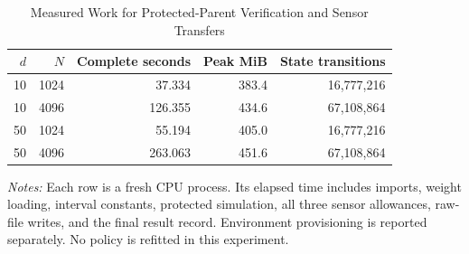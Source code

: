\begin{table}[!htbp]
\centering
\caption{Measured Work for Protected-Parent Verification and Sensor Transfers}
\label{tab:r15observationwork}
\footnotesize
\begin{tabular}{rrrrr}
\toprule
$d$ & $N$ & Complete seconds & Peak MiB & State transitions \\
\midrule
10 & 1024 & 37.334 & 383.4 & 16,777,216 \\
10 & 4096 & 126.355 & 434.6 & 67,108,864 \\
50 & 1024 & 55.194 & 405.0 & 16,777,216 \\
50 & 4096 & 263.063 & 451.6 & 67,108,864 \\
\bottomrule
\end{tabular}
\begin{minipage}{0.95\linewidth}\footnotesize
\emph{Notes:} Each row is a fresh CPU process. Its elapsed time includes imports,
weight loading, interval constants, protected simulation, all three sensor
allowances, raw-file writes, and the final result record. Environment provisioning
is reported separately. No policy is refitted in this experiment.
\end{minipage}
\end{table}
